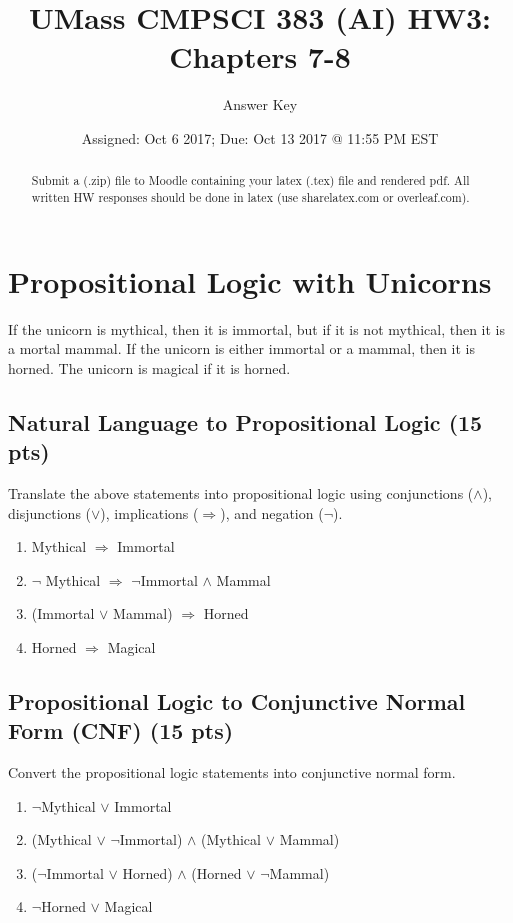 \documentclass{article}
\title{UMass CMPSCI 383 (AI) HW3: Chapters 7-8}
\author{Answer Key}
\date{Assigned: Oct 6 2017; Due: Oct 13 2017 @ 11:55 PM EST}
\begin{document}
\maketitle

\begin{abstract}
    Submit a (.zip) file to Moodle containing your latex (.tex) file and rendered pdf. All written HW responses should be done in latex (use sharelatex.com or overleaf.com).
\end{abstract}

\section{Propositional Logic with Unicorns}
If the unicorn is mythical, then it is immortal, but if it is not mythical, then it is a mortal mammal. If the unicorn is either immortal or a mammal, then it is horned. The unicorn is magical if it is horned.

\subsection{Natural Language to Propositional Logic (15 pts)}

Translate the above statements into propositional logic using conjunctions ($\land$), disjunctions ($\lor$), implications ($\Rightarrow$), and negation ($\lnot$).

\begin{enumerate}
    \item Mythical $\Rightarrow$ Immortal 
    \item $\lnot$ Mythical $\Rightarrow$ $\lnot$Immortal $\land$  Mammal
    \item (Immortal $\lor$ Mammal) $\Rightarrow$ Horned
    \item Horned $\Rightarrow$ Magical
\end{enumerate}

\subsection{Propositional Logic to Conjunctive Normal Form (CNF) (15 pts)}
Convert the propositional logic statements into conjunctive normal form.

\begin{enumerate}
    \item $\lnot$Mythical $\lor$ Immortal
    \item (Mythical $\lor$ $\lnot$Immortal)  $\land$ (Mythical $\lor$ Mammal) 
    \item ($\lnot$Immortal $\lor$ Horned) $\land$ (Horned $\lor$ $\lnot$Mammal)
    \item $\lnot$Horned $\lor$ Magical
\end{enumerate}
\end{document}
